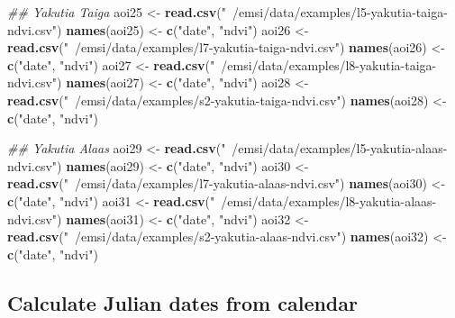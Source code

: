 \documentclass[
]{article}
\newenvironment{Shaded}{\begin{snugshade}}{\end{snugshade}}
\newcommand{\CommentTok}[1]{\textcolor[rgb]{0.56,0.35,0.01}{\textit{#1}}}
\newcommand{\KeywordTok}[1]{\textcolor[rgb]{0.13,0.29,0.53}{\textbf{#1}}}
\newcommand{\NormalTok}[1]{#1}
\newcommand{\StringTok}[1]{\textcolor[rgb]{0.31,0.60,0.02}{#1}}
\begin{document}
\begin{Shaded}
\begin{Highlighting}[]
\CommentTok{## Yakutia Taiga}
\NormalTok{aoi25 <-}\StringTok{ }\KeywordTok{read.csv}\NormalTok{(}\StringTok{"~/emsi/data/examples/l5-yakutia-taiga-ndvi.csv"}\NormalTok{)}
\KeywordTok{names}\NormalTok{(aoi25) <-}\StringTok{ }\KeywordTok{c}\NormalTok{(}\StringTok{"date"}\NormalTok{, }\StringTok{"ndvi"}\NormalTok{)}
\NormalTok{aoi26 <-}\StringTok{ }\KeywordTok{read.csv}\NormalTok{(}\StringTok{"~/emsi/data/examples/l7-yakutia-taiga-ndvi.csv"}\NormalTok{)}
\KeywordTok{names}\NormalTok{(aoi26) <-}\StringTok{ }\KeywordTok{c}\NormalTok{(}\StringTok{"date"}\NormalTok{, }\StringTok{"ndvi"}\NormalTok{)}
\NormalTok{aoi27 <-}\StringTok{ }\KeywordTok{read.csv}\NormalTok{(}\StringTok{"~/emsi/data/examples/l8-yakutia-taiga-ndvi.csv"}\NormalTok{)}
\KeywordTok{names}\NormalTok{(aoi27) <-}\StringTok{ }\KeywordTok{c}\NormalTok{(}\StringTok{"date"}\NormalTok{, }\StringTok{"ndvi"}\NormalTok{)}
\NormalTok{aoi28 <-}\StringTok{ }\KeywordTok{read.csv}\NormalTok{(}\StringTok{"~/emsi/data/examples/s2-yakutia-taiga-ndvi.csv"}\NormalTok{)}
\KeywordTok{names}\NormalTok{(aoi28) <-}\StringTok{ }\KeywordTok{c}\NormalTok{(}\StringTok{"date"}\NormalTok{, }\StringTok{"ndvi"}\NormalTok{)}

\CommentTok{## Yakutia Alaas}
\NormalTok{aoi29 <-}\StringTok{ }\KeywordTok{read.csv}\NormalTok{(}\StringTok{"~/emsi/data/examples/l5-yakutia-alaas-ndvi.csv"}\NormalTok{)}
\KeywordTok{names}\NormalTok{(aoi29) <-}\StringTok{ }\KeywordTok{c}\NormalTok{(}\StringTok{"date"}\NormalTok{, }\StringTok{"ndvi"}\NormalTok{)}
\NormalTok{aoi30 <-}\StringTok{ }\KeywordTok{read.csv}\NormalTok{(}\StringTok{"~/emsi/data/examples/l7-yakutia-alaas-ndvi.csv"}\NormalTok{)}
\KeywordTok{names}\NormalTok{(aoi30) <-}\StringTok{ }\KeywordTok{c}\NormalTok{(}\StringTok{"date"}\NormalTok{, }\StringTok{"ndvi"}\NormalTok{)}
\NormalTok{aoi31 <-}\StringTok{ }\KeywordTok{read.csv}\NormalTok{(}\StringTok{"~/emsi/data/examples/l8-yakutia-alaas-ndvi.csv"}\NormalTok{)}
\KeywordTok{names}\NormalTok{(aoi31) <-}\StringTok{ }\KeywordTok{c}\NormalTok{(}\StringTok{"date"}\NormalTok{, }\StringTok{"ndvi"}\NormalTok{)}
\NormalTok{aoi32 <-}\StringTok{ }\KeywordTok{read.csv}\NormalTok{(}\StringTok{"~/emsi/data/examples/s2-yakutia-alaas-ndvi.csv"}\NormalTok{)}
\KeywordTok{names}\NormalTok{(aoi32) <-}\StringTok{ }\KeywordTok{c}\NormalTok{(}\StringTok{"date"}\NormalTok{, }\StringTok{"ndvi"}\NormalTok{)}
\end{Highlighting}
\end{Shaded}

\hypertarget{calculate-julian-dates-from-calendar}{%
\subsection{Calculate Julian dates from
calendar}\label{calculate-julian-dates-from-calendar}}
\end{document}

